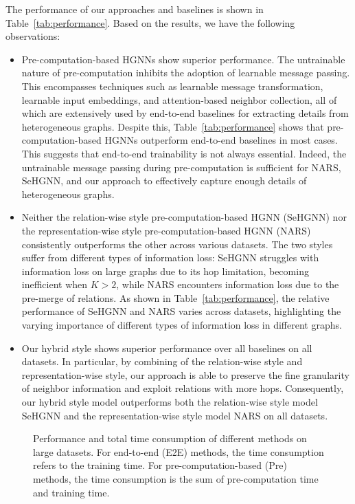 \documentclass[lettersize,journal]{IEEEtran}
\begin{document}
The performance of our approaches and baselines is shown in Table~\ref{tab:performance}.
Based on the results, we have the following observations:
\begin{itemize}
\item Pre-computation-based HGNNs show superior performance. 
The untrainable nature of pre-computation inhibits the adoption of learnable message passing. 
This encompasses techniques such as learnable message transformation, learnable input embeddings, and attention-based neighbor collection, all of which are extensively used by end-to-end baselines for extracting details from heterogeneous graphs.
Despite this, Table~\ref{tab:performance} shows that pre-computation-based HGNNs outperform end-to-end baselines in most cases.
This suggests that end-to-end trainability is not always essential.
Indeed, the untrainable message passing during pre-computation is sufficient for NARS, SeHGNN, and our approach to effectively capture enough details of heterogeneous graphs.
\item Neither the relation-wise style pre-computation-based HGNN (SeHGNN) nor the representation-wise style pre-computation-based HGNN (NARS) consistently outperforms the other across various datasets.
The two styles suffer from different types of information loss: SeHGNN struggles with information loss on large graphs due to its hop limitation, becoming inefficient when $K > 2$, while NARS encounters information loss due to the pre-merge of relations.
As shown in Table~\ref{tab:performance}, the relative performance of SeHGNN and NARS varies across datasets, highlighting the varying importance of different types of information loss in different graphs.
\item Our hybrid style shows superior performance over all baselines on all datasets.
In particular, by combining of the relation-wise style and representation-wise style, our approach is able to preserve the fine granularity of neighbor information and exploit relations with more hops.
Consequently, our hybrid style model outperforms both the relation-wise style model SeHGNN and the representation-wise style model NARS on all datasets.
\end{itemize}





\begin{figure}[!t]
\vspace{-5mm}
\centering
{}
\caption{
Performance and total time consumption of different methods on large datasets.
For end-to-end (E2E) methods, the time consumption refers to the training time.
For pre-computation-based (Pre) methods, the time consumption is the sum of pre-computation time and training time.
}
\label{fig:visualize_time_score} \end{figure}
\end{document}
